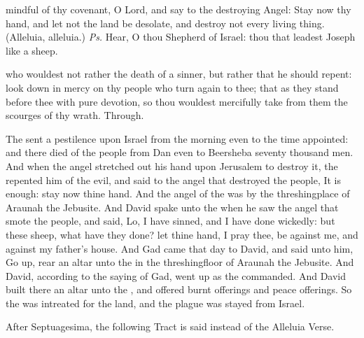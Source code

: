 \introit
{} mindful of thy covenant, O Lord, and say to the destroying Angel: Stay now thy hand, and let not the land be desolate, and destroy not every living thing. (Alleluia, alleluia.) \textit{Ps.} Hear, O thou Shepherd of Israel: thou that leadest Joseph like a sheep.

\collect
{} who wouldest not rather the death of a sinner, but rather that he should repent: look down in mercy on thy people who turn again to thee; that as they stand before thee with pure devotion, so thou wouldest mercifully take from them the scourges of thy wrath. Through.

 The  sent a pestilence upon Israel from the morning even to the time appointed: and there died of the people from Dan even to Beersheba seventy thousand men. And when the angel stretched out his hand upon Jerusalem to destroy it, the  repented him of the evil, and said to the angel that destroyed the people, It is enough: stay now thine hand. And the angel of the  was by the threshingplace of Araunah the Jebusite. And David spake unto the  when he saw the angel that smote the people, and said, Lo, I have sinned, and I have done wickedly: but these sheep, what have they done? let thine hand, I pray thee, be against me, and against my father's house. And Gad came that day to David, and said unto him, Go up, rear an altar unto the  in the threshingfloor of Araunah the Jebusite. And David, according to the saying of Gad, went up as the  commanded. And David built there an altar unto the , and offered burnt offerings and peace offerings. So the  was intreated for the land, and the plague was stayed from Israel.


\begin{rubric}
    After Septuagesima, the following Tract is said instead of the Alleluia Verse.
\end{rubric}


